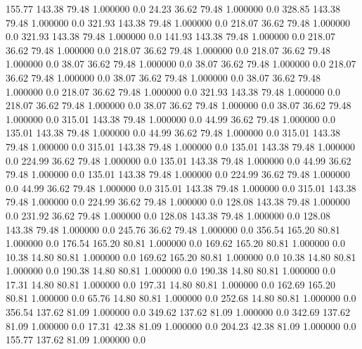   155.77  143.38   79.48    1.000000    0.0
   24.23   36.62   79.48    1.000000    0.0
  328.85  143.38   79.48    1.000000    0.0
  321.93  143.38   79.48    1.000000    0.0
  218.07   36.62   79.48    1.000000    0.0
  321.93  143.38   79.48    1.000000    0.0
  141.93  143.38   79.48    1.000000    0.0
  218.07   36.62   79.48    1.000000    0.0
  218.07   36.62   79.48    1.000000    0.0
  218.07   36.62   79.48    1.000000    0.0
   38.07   36.62   79.48    1.000000    0.0
   38.07   36.62   79.48    1.000000    0.0
  218.07   36.62   79.48    1.000000    0.0
   38.07   36.62   79.48    1.000000    0.0
   38.07   36.62   79.48    1.000000    0.0
  218.07   36.62   79.48    1.000000    0.0
  321.93  143.38   79.48    1.000000    0.0
  218.07   36.62   79.48    1.000000    0.0
   38.07   36.62   79.48    1.000000    0.0
   38.07   36.62   79.48    1.000000    0.0
  315.01  143.38   79.48    1.000000    0.0
   44.99   36.62   79.48    1.000000    0.0
  135.01  143.38   79.48    1.000000    0.0
   44.99   36.62   79.48    1.000000    0.0
  315.01  143.38   79.48    1.000000    0.0
  315.01  143.38   79.48    1.000000    0.0
  135.01  143.38   79.48    1.000000    0.0
  224.99   36.62   79.48    1.000000    0.0
  135.01  143.38   79.48    1.000000    0.0
   44.99   36.62   79.48    1.000000    0.0
  135.01  143.38   79.48    1.000000    0.0
  224.99   36.62   79.48    1.000000    0.0
   44.99   36.62   79.48    1.000000    0.0
  315.01  143.38   79.48    1.000000    0.0
  315.01  143.38   79.48    1.000000    0.0
  224.99   36.62   79.48    1.000000    0.0
  128.08  143.38   79.48    1.000000    0.0
  231.92   36.62   79.48    1.000000    0.0
  128.08  143.38   79.48    1.000000    0.0
  128.08  143.38   79.48    1.000000    0.0
  245.76   36.62   79.48    1.000000    0.0
  356.54  165.20   80.81    1.000000    0.0
  176.54  165.20   80.81    1.000000    0.0
  169.62  165.20   80.81    1.000000    0.0
   10.38   14.80   80.81    1.000000    0.0
  169.62  165.20   80.81    1.000000    0.0
   10.38   14.80   80.81    1.000000    0.0
  190.38   14.80   80.81    1.000000    0.0
  190.38   14.80   80.81    1.000000    0.0
   17.31   14.80   80.81    1.000000    0.0
  197.31   14.80   80.81    1.000000    0.0
  162.69  165.20   80.81    1.000000    0.0
   65.76   14.80   80.81    1.000000    0.0
  252.68   14.80   80.81    1.000000    0.0
  356.54  137.62   81.09    1.000000    0.0
  349.62  137.62   81.09    1.000000    0.0
  342.69  137.62   81.09    1.000000    0.0
   17.31   42.38   81.09    1.000000    0.0
  204.23   42.38   81.09    1.000000    0.0
  155.77  137.62   81.09    1.000000    0.0
